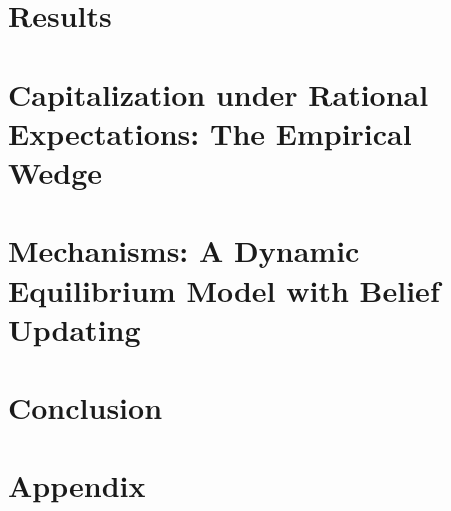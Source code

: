 \documentclass[12pt]{article}
\begin{document}
\section{Results} \label{sec:result}


\section{Capitalization under Rational Expectations: The Empirical Wedge} \label{sec:fiscal_illusion}


\section{Mechanisms: A Dynamic Equilibrium Model with Belief Updating} \label{sec:mech}




\section{Conclusion} \label{sec:conclusion}


\singlespacing
\setlength\bibsep{12pt}



\clearpage

\appendix
\section*{Appendix} \label{sec:appendix}


\clearpage
\end{document}
